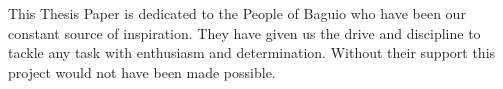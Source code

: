 \vfill
\begin{center}
This Thesis Paper is dedicated to the People of Baguio who have been our constant source of inspiration. They have given us the drive and discipline to tackle any task with enthusiasm and determination. Without their support this project would not have been made possible.
\end{center}
\vfill
